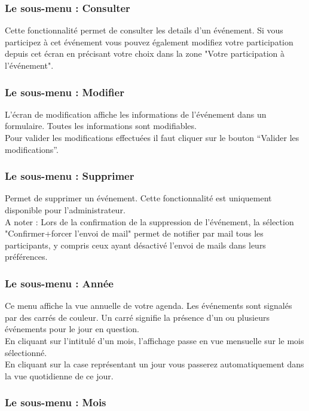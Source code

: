 \subsubsection{Le sous-menu : Consulter}

Cette fonctionnalité permet de consulter les details d'un événement. Si vous
participez à cet événement vous pouvez également modifiez votre participation
depuis cet écran en précisant votre choix dans la zone "Votre participation à l'événement".

\subsubsection{Le sous-menu : Modifier}

L'écran de modification affiche les informations de l'événement dans un
formulaire. Toutes les informations sont modifiables.\\

Pour valider les modifications effectuées il faut cliquer sur le bouton 
``Valider les modifications''.

\subsubsection{Le sous-menu : Supprimer}

Permet de supprimer un événement. Cette fonctionnalité est uniquement
disponible pour l'administrateur.\\
A noter : Lors de la confirmation de la suppression de l'événement, la
sélection "Confirmer+forcer l'envoi de mail" permet de notifier par mail
tous les participants, y compris ceux ayant désactivé l'envoi de mails dans leurs préférences.

\subsubsection{Le sous-menu : Année}

Ce menu affiche la vue annuelle de votre agenda.
Les événements sont signalés par des carrés de couleur. Un carré signifie la présence d'un ou plusieurs événements pour le jour en question.\\

En cliquant sur l'intitulé d'un mois, l'affichage passe en vue mensuelle sur le mois sélectionné.\\
En cliquant sur la case représentant un jour vous passerez automatiquement
dans la vue quotidienne de ce jour.

\subsubsection{Le sous-menu : Mois}

